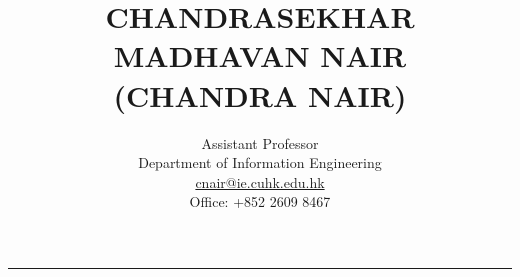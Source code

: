\documentclass[11pt]{article}
\begin{document}
\title{ \normalsize CHANDRASEKHAR MADHAVAN NAIR\\
\normalsize (CHANDRA NAIR)} 

\author{\small Assistant Professor\\
\small Department of Information Engineering\\ 
\small \url{cnair@ie.cuhk.edu.hk}\\
\small Office: +852 2609 8467}



\date{}
\maketitle
\thispagestyle{empty}
\vspace{-0.3in}
\hrule
\vspace{0.02in}








\nocite{pnpy01,nps01, enpuz02,nai02,nps03,nps04,now05,npsj05, nai05,
bcmn05a,bcmn05b,nae06, nae07,ban06,nps07,hjlnw06, bgknt07, hknw07}


 





 
\end{document}
